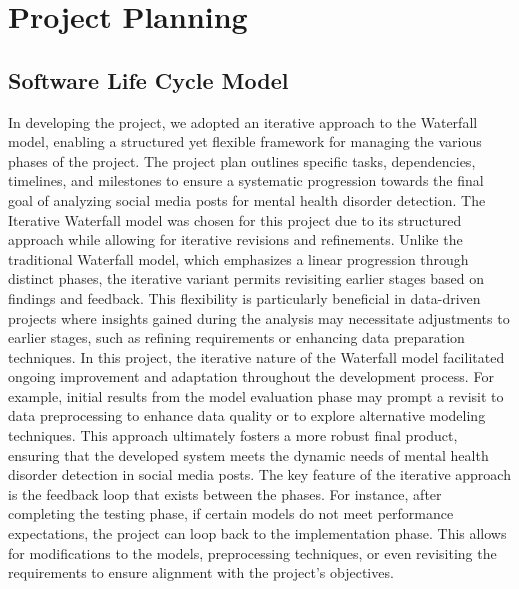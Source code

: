 
\section{Project Planning}

\subsection{Software Life Cycle Model}
\noindent
In developing the project, we adopted an iterative approach to the Waterfall model, enabling a structured yet flexible framework for managing the various phases of the project. The project plan outlines specific tasks, dependencies, timelines, and milestones to ensure a systematic progression towards the final goal of analyzing social media posts for mental health disorder detection. The Iterative Waterfall model was chosen for this project due to its structured approach while allowing for iterative revisions and refinements. Unlike the traditional Waterfall model, which emphasizes a linear progression through distinct phases, the iterative variant permits revisiting earlier stages based on findings and feedback. This flexibility is particularly beneficial in data-driven projects where insights gained during the analysis may necessitate adjustments to earlier stages, such as refining requirements or enhancing data preparation techniques. In this project, the iterative nature of the Waterfall model facilitated ongoing improvement and adaptation throughout the development process. For example, initial results from the model evaluation phase may prompt a revisit to data preprocessing to enhance data quality or to explore alternative modeling techniques. This approach ultimately fosters a more robust final product, ensuring that the developed system meets the dynamic needs of mental health disorder detection in social media posts. The key feature of the iterative approach is the feedback loop that exists between the phases. For instance, after completing the testing phase, if certain models do not meet performance expectations, the project can loop back to the implementation phase. This allows for modifications to the models, preprocessing techniques, or even revisiting the requirements to ensure alignment with the project's objectives.

